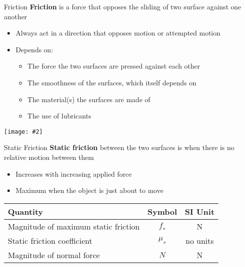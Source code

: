 \documentclass[12pt,compress,aspectratio=169]{beamer}
\newcommand{\pic}[2]{\texttt{[image: \#2]}}
\newcommand{\eq}[2]{\vspace{#1}{\Large\begin{displaymath}#2\end{displaymath}}}
\begin{document}
\begin{frame}{Friction}
  \textbf{Friction} is a force that opposes the sliding of two surface against
  one another
  \begin{itemize}
  \item Always act in a direction that opposes motion or attempted motion
  \item Depends on:
    \begin{itemize}
    \item The force the two surfaces are pressed against each other
    \item The smoothness of the surfaces, which itself depends on
    \item The material(s) the surfaces are made of
    \item The use of lubricants
    \end{itemize}
  \end{itemize}
  \begin{center}
    \pic{.6}{graphics/friction.png}
  \end{center}
\end{frame}



\begin{frame}{Static Friction}
  \textbf{Static friction} between the two surfaces is when there is no
  relative motion between them
  \begin{itemize}
  \item Increases with increasing applied force
  \item Maximum when the object is just about to move
  \end{itemize}

  \eq{-.35in}{
    \boxed{f_s\leq\mu_sN}
  }
  \begin{center}
    \begin{tabular}{l|c|c}
      \rowcolor{pink}
      \textbf{Quantity} & \textbf{Symbol} & \textbf{SI Unit} \\ \hline
      Magnitude of maximum static friction & $f_s$ & \si{\newton} \\
      Static friction coefficient  & $\mu_s$ & no units \\
      Magnitude of normal force    & $N$ & \si{\newton}
    \end{tabular}
  \end{center}
\end{frame}
\end{document}
